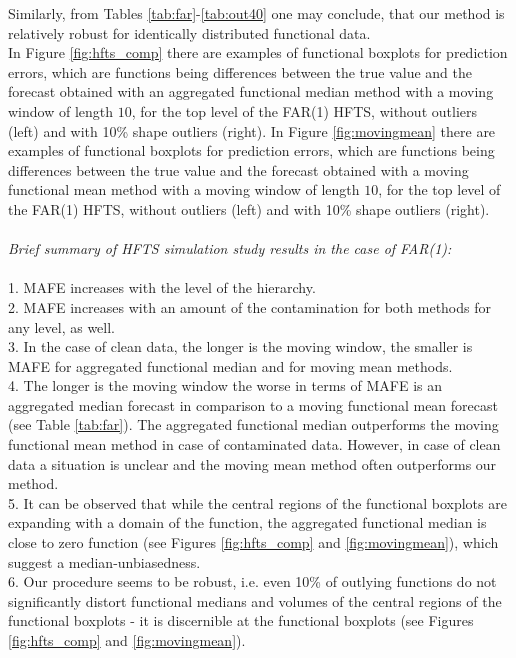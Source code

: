 \documentclass[12pt,a4paper]{article}
\numberwithin{equation}{section}
\begin{document}
Similarly, from Tables \ref{tab:far}-\ref{tab:out40} one may conclude, that our method is relatively robust for identically distributed functional data.
\\ In Figure \ref{fig:hfts_comp} there are examples of functional boxplots for prediction errors, which are functions being differences between the true value and the forecast obtained with an aggregated functional median method with a moving window of length $10$, for the top level of the FAR(1) HFTS, without outliers (left) and with 10\% shape outliers (right). In Figure \ref{fig:movingmean} there are examples of functional boxplots for prediction errors, which are functions being differences between the true value and the forecast obtained with a moving functional mean method with a moving window of length $10$, for the top level of the FAR(1) HFTS, without outliers (left) and with 10\% shape outliers (right). 
\\
\\ \textit{Brief summary of HFTS simulation study results in the case of FAR(1):}
\\
\\ 1. MAFE increases with the level of the hierarchy.
\\ 2. MAFE increases with an amount of the contamination for both methods for any level, as well.
\\ 3. In the case of clean data, the longer is the moving window, the smaller is MAFE for aggregated functional median and for moving mean methods.
\\ 4. The longer is the moving window the worse in terms of MAFE is an aggregated median forecast in comparison to a moving functional mean forecast (see Table \ref{tab:far}). The aggregated functional median outperforms the moving functional mean method in case of contaminated data. However, in case of clean data a situation is unclear and the moving mean method often outperforms our method. 
\\ 5. It can be observed that while the central regions of the functional boxplots are expanding with a domain of the function, the aggregated functional median is close to zero function (see Figures \ref{fig:hfts_comp} and \ref{fig:movingmean}), which suggest a median-unbiasedness. 
\\ 6. Our procedure seems to be robust, i.e. even 10\% of outlying functions do not significantly distort functional medians and volumes of the central regions of the functional boxplots - it is discernible at the functional boxplots (see Figures \ref{fig:hfts_comp} and \ref{fig:movingmean}). 
\end{document}
